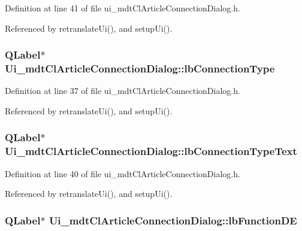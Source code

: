 Definition at line 41 of file ui\-\_\-mdt\-Cl\-Article\-Connection\-Dialog.\-h.



Referenced by retranslate\-Ui(), and setup\-Ui().

\hypertarget{class_ui__mdt_cl_article_connection_dialog_a195d87b2dea6e827f9a942c385f1f295}{
\subsubsection[{lb\-Connection\-Type}]{\setlength{\rightskip}{0pt plus 5cm}Q\-Label$\ast$ Ui\-\_\-mdt\-Cl\-Article\-Connection\-Dialog\-::lb\-Connection\-Type}}\label{class_ui__mdt_cl_article_connection_dialog_a195d87b2dea6e827f9a942c385f1f295}


Definition at line 37 of file ui\-\_\-mdt\-Cl\-Article\-Connection\-Dialog.\-h.



Referenced by retranslate\-Ui(), and setup\-Ui().

\hypertarget{class_ui__mdt_cl_article_connection_dialog_a8be4af6e453f508aa47d5d54c8feecb6}{
\subsubsection[{lb\-Connection\-Type\-Text}]{\setlength{\rightskip}{0pt plus 5cm}Q\-Label$\ast$ Ui\-\_\-mdt\-Cl\-Article\-Connection\-Dialog\-::lb\-Connection\-Type\-Text}}\label{class_ui__mdt_cl_article_connection_dialog_a8be4af6e453f508aa47d5d54c8feecb6}


Definition at line 40 of file ui\-\_\-mdt\-Cl\-Article\-Connection\-Dialog.\-h.



Referenced by retranslate\-Ui(), and setup\-Ui().

\hypertarget{class_ui__mdt_cl_article_connection_dialog_a7fa5f9f350509341df4b915348019b71}{
\subsubsection[{lb\-Function\-D\-E}]{\setlength{\rightskip}{0pt plus 5cm}Q\-Label$\ast$ Ui\-\_\-mdt\-Cl\-Article\-Connection\-Dialog\-::lb\-Function\-D\-E}}\label{class_ui__mdt_cl_article_connection_dialog_a7fa5f9f350509341df4b915348019b71}


